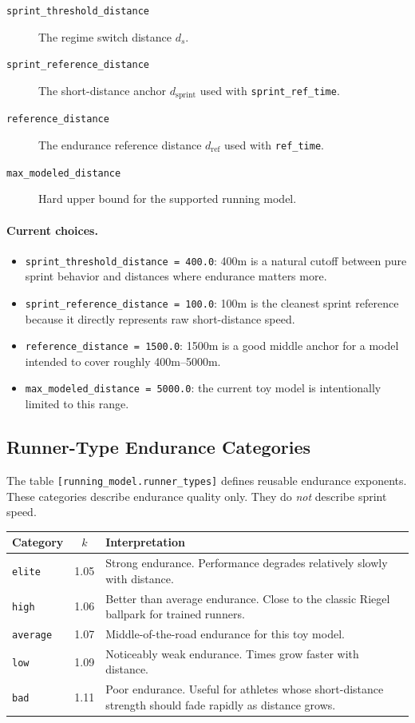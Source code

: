 \documentclass[11pt]{article}
\begin{document}
\begin{description}
    \item[\texttt{sprint\_threshold\_distance}] The regime switch distance $d_s$.
    \item[\texttt{sprint\_reference\_distance}] The short-distance anchor $d_{\mathrm{sprint}}$ used with \texttt{sprint\_ref\_time}.
    \item[\texttt{reference\_distance}] The endurance reference distance $d_{\mathrm{ref}}$ used with \texttt{ref\_time}.
    \item[\texttt{max\_modeled\_distance}] Hard upper bound for the supported running model.
\end{description}

\paragraph{Current choices.}
\begin{itemize}
    \item \texttt{sprint\_threshold\_distance = 400.0}: 400m is a natural cutoff between pure sprint behavior and distances where endurance matters more.
    \item \texttt{sprint\_reference\_distance = 100.0}: 100m is the cleanest sprint reference because it directly represents raw short-distance speed.
    \item \texttt{reference\_distance = 1500.0}: 1500m is a good middle anchor for a model intended to cover roughly 400m--5000m.
    \item \texttt{max\_modeled\_distance = 5000.0}: the current toy model is intentionally limited to this range.
\end{itemize}

\subsection*{Runner-Type Endurance Categories}

The table \texttt{[running\_model.runner\_types]} defines reusable endurance exponents.
These categories describe endurance quality only. They do \emph{not} describe sprint speed.

\begin{center}
\begin{tabular}{|l|c|p{8cm}|}
\hline
\textbf{Category} & \textbf{$k$} & \textbf{Interpretation} \\
\hline
\texttt{elite} & 1.05 & Strong endurance. Performance degrades relatively slowly with distance. \\
\hline
\texttt{high} & 1.06 & Better than average endurance. Close to the classic Riegel ballpark for trained runners. \\
\hline
\texttt{average} & 1.07 & Middle-of-the-road endurance for this toy model. \\
\hline
\texttt{low} & 1.09 & Noticeably weak endurance. Times grow faster with distance. \\
\hline
\texttt{bad} & 1.11 & Poor endurance. Useful for athletes whose short-distance strength should fade rapidly as distance grows. \\
\hline
\end{tabular}
\end{center}
\end{document}
